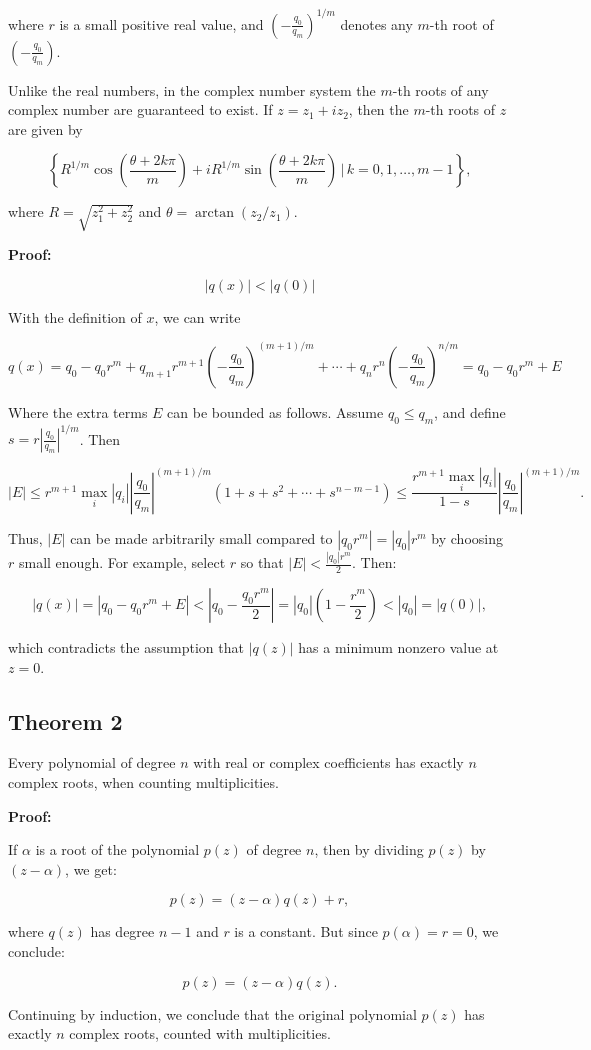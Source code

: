 where \(r\) is a small positive real value, and \({\left(-\frac{q_0}{q_m}\right)}^{1/m}\) denotes any 
\(m\)-th root of \(\left(-\frac{q_0}{q_m}\right)\).
\vspace{\baselineskip}

Unlike the real numbers, in the complex number system the \(m\)-th roots of any complex number are 
guaranteed to exist. If \(z = z_1 + i z_2\), then the \(m\)-th roots of \(z\) are given by

\[
	\left\{ R^{1/m} \cos\left(\frac{\theta + 2k\pi}{m}\right) + i R^{1/m} \sin\left(\frac{\theta + 
	2k\pi}{m}\right) \,\bigg|\, k = 0, 1, \ldots, m-1 \right\},
\]

where \(R = \sqrt{z_1^2 + z_2^2}\) and \(\theta = \arctan(z_2 / z_1)\).
\vspace{\baselineskip}

\textbf{Proof:} 

\[|q(x)| < |q(0)|\]

With the definition of \(x\), we can write

\[
	q(x) = q_0 - q_0 r^m + q_{m+1} r^{m+1} {\left(-\frac{q_0}{q_m}\right)}^{(m+1)/m} + \cdots + q_n r^n 
	{\left(-\frac{q_0}{q_m}\right)}^{n/m} = q_0 - q_0 r^m + E
\]

Where the extra terms \(E\) can be bounded as follows. Assume \(q_0 \leq q_m\), and define 
\(s = r \left|\frac{q_0}{q_m}\right|^{1/m}\). Then

\[
	|E| \leq r^{m+1} \max_i |q_i| \left|\frac{q_0}{q_m}\right|^{(m+1)/m} (1 + s + s^2 + 
	\cdots + s^{n - m - 1}) \leq \frac{r^{m+1} \max_i |q_i|}{1 - s} \left|\frac{q_0}{q_m}\right|^{(m+1)/m}.
\]

Thus, \(|E|\) can be made arbitrarily small compared to \(|q_0 r^m| = |q_0| r^m\) by choosing \(r\) 
small enough. For example, select \(r\) so that \(|E| < \frac{|q_0| r^m}{2}\). Then:

\[
	|q(x)| = |q_0 - q_0 r^m + E| < |q_0 - \frac{q_0 r^m}{2}| = |q_0| \left(1 - \frac{r^m}{2}\right) < 
	|q_0| = |q(0)|,
\]

which contradicts the assumption that \(|q(z)|\) has a minimum nonzero value at \(z = 0\).
\QED

\subsection{Theorem 2}

Every polynomial of degree \(n\) with real or complex coefficients has exactly \(n\) complex roots, 
when counting multiplicities.
\vspace{\baselineskip}

\textbf{Proof:}

If \(\alpha\) is a root of the polynomial \(p(z)\) of degree \(n\), then by dividing 
\(p(z)\) by \((z - \alpha)\), we get:

\[
	p(z) = (z - \alpha) q(z) + r,
\]

where \(q(z)\) has degree \(n - 1\) and \(r\) is a constant. But since \(p(\alpha) = r = 0\), we conclude:

\[
	p(z) = (z - \alpha) q(z).
\]

Continuing by induction, we conclude that the original polynomial \(p(z)\) has exactly \(n\) 
complex roots, counted with multiplicities.

\QED
